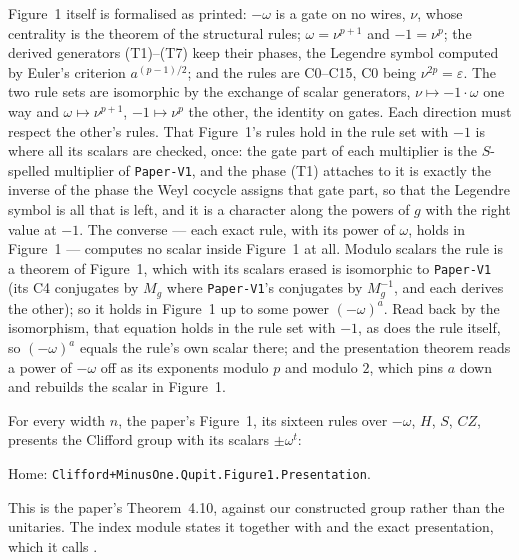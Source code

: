 Figure~1 itself is formalised as printed: $-\omega$ is a gate on no
wires, $\nu$, whose centrality is the theorem  of the
structural rules; $\omega = \nu^{p+1}$ and $-1 = \nu^{p}$; the derived
generators (T1)--(T7) keep their phases, the Legendre symbol computed by
Euler's criterion $a^{(p-1)/2}$; and the rules are C0--C15, C0 being
$\nu^{2p} = \varepsilon$.  The two rule sets are isomorphic by the
exchange of scalar generators, $\nu \mapsto -1 \cdot \omega$ one way and
$\omega \mapsto \nu^{p+1}$, $-1 \mapsto \nu^{p}$ the other, the identity
on gates.  Each direction must respect the other's rules.  That
Figure~1's rules hold in the rule set with $-1$ is where all its
scalars are checked, once: the gate part of each multiplier is the
$S$-spelled multiplier of \texttt{Paper-V1}, and the phase (T1) attaches
to it is exactly the inverse of the phase the Weyl cocycle assigns that
gate part, so that the Legendre symbol is all that is left, and it is a
character along the powers of $g$ with the right value at $-1$.  The
converse --- each exact rule, with its power of $\omega$, holds in
Figure~1 --- computes no scalar inside Figure~1 at all.  Modulo scalars
the rule is a theorem of Figure~1, which with its scalars erased is
isomorphic to \texttt{Paper-V1} (its C4 conjugates by $M_g$ where
\texttt{Paper-V1}'s  conjugates by $M_g^{-1}$, and each
derives the other); so it holds in Figure~1 up to some power
$(-\omega)^a$.  Read back by the isomorphism, that equation holds in the
rule set with $-1$, as does the rule itself, so $(-\omega)^a$ equals the
rule's own scalar there; and the presentation theorem reads a power of
$-\omega$ off as its exponents modulo $p$ and modulo $2$, which pins
$a$ down and rebuilds the scalar in Figure~1.

\begin{theorem}\label{thm:figure1}
For every width $n$, the paper's Figure~1, its sixteen rules over
$-\omega$, $H$, $S$, $CZ$, presents the Clifford group with its scalars
$\pm\omega^t$:
\begin{code}%
\>[0]\AgdaSpace{}%
\AgdaSymbol{:}\AgdaSpace{}%
\AgdaSpace{}%
\AgdaSpace{}%
\AgdaSpace{}%
\AgdaSymbol{(}\AgdaSpace{}%
\AgdaSymbol{)}\AgdaSpace{}%
\AgdaSpace{}%
\AgdaSymbol{(}\AgdaSpace{}%
\AgdaSymbol{)}\<%
\end{code}
\begin{code}[hide]%
\>[0]\AgdaSpace{}%
\AgdaSymbol{=}\AgdaSpace{}%
\<%
\end{code}
\noindent Home: \texttt{Clifford+MinusOne.Qupit.Figure1.Presentation}.
\end{theorem}

\noindent This is the paper's Theorem~4.10, against our constructed
group rather than the unitaries.  The index module states it together
with  and the exact presentation, which it
calls .
